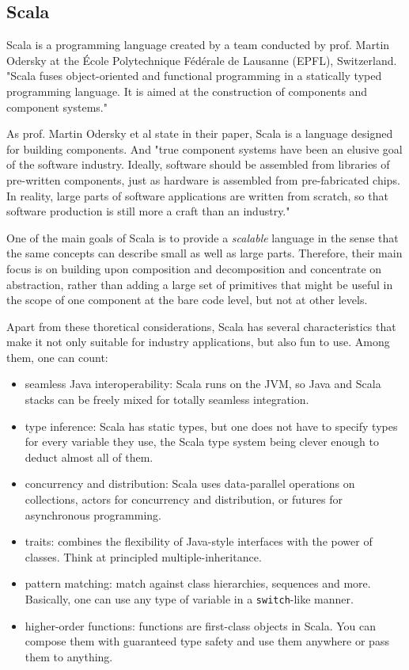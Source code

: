 
\subsection{Scala}
\label{sub-sec:scala}

Scala is a programming language created by a team conducted by prof. Martin
Odersky at the \'Ecole Polytechnique F\'ed\'erale de Lausanne (EPFL), Switzerland.
"Scala fuses object-oriented and functional programming in a statically typed
programming language. It is aimed at the construction of components and
component systems."\cite{scala}

As prof. Martin Odersky et al state in their paper\cite{scala}, Scala is a language designed for
building components. And "true component systems have been an elusive goal
of the software industry.
Ideally, software should be assembled from libraries of pre-written
components, just as hardware is assembled from pre-fabricated chips. In
reality, large parts of software applications are written from scratch, so
that software production is still more a craft than an industry."

One of the main goals of Scala is to provide a \textit{scalable} language in
the sense that the same concepts can describe small as well as large parts.
Therefore, their main focus is on building upon composition and decomposition
and concentrate on abstraction, rather than adding a large set of primitives
that might be useful in the scope of one component at the bare code level, but
not at other levels.

Apart from these thoretical considerations, Scala has several characteristics
that make it not only suitable for industry applications, but also fun to use.
Among them, one can count:
\begin{itemize}
  \item seamless Java interoperability: Scala runs on the JVM, so Java and Scala
  stacks can be freely mixed for totally seamless integration.
  \item type inference: Scala has static types, but one does not have to
  specify types for every variable they use, the Scala type system being
  clever enough to deduct almost all of them.
  \item concurrency and distribution: Scala uses data-parallel operations on
  collections, actors for concurrency and distribution, or futures for
  asynchronous programming.
  \item traits: combines the flexibility of Java-style interfaces with the
  power of classes. Think at principled multiple-inheritance.
  \item pattern matching: match against class hierarchies, sequences and more.
  Basically, one can use any type of variable in a \texttt{switch}-like
  manner.
  \item higher-order functions: functions are first-class objects in Scala.
  You can compose them with guaranteed type safety and use them anywhere or pass
  them to anything.
\end{itemize}

